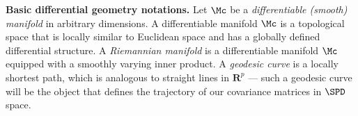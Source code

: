{\bf Basic differential geometry notations.} 
Let $\Mc$ be a \textit{differentiable (smooth) manifold} in arbitrary dimensions.
A differentiable manifold $\Mc$ is a topological
space that is locally similar to Euclidean space and has a globally
defined differential structure. 
%
%
A \textit{Riemannian manifold} is a differentiable manifold $\Mc$ equipped with a smoothly varying inner product.
A \textit{geodesic curve} is a locally shortest path, which is  analogous to straight lines in $\textbf{R}^{p}$ --- such a geodesic 
curve will be the object that defines the trajectory of our covariance matrices in $\SPD$ space. 
